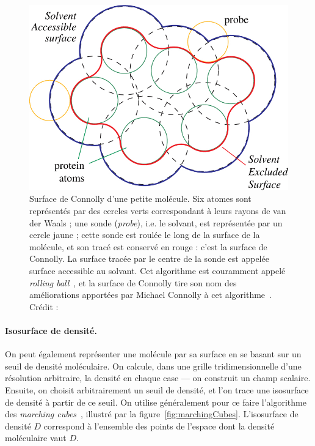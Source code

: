 	\begin{figure}[H]
		\centering
		\includegraphics[width=\textwidth]{figures/ch1/connolly}
		\caption{Surface de Connolly d'une petite molécule. Six atomes sont représentés par des cercles verts correspondant à leurs rayons de van der Waals ; une sonde (\emph{probe}), i.e. le solvant, est représentée par un cercle jaune ; cette sonde est \og roulée \fg{} le long de la surface de la molécule, et son tracé est conservé en rouge : c'est la surface de Connolly. La surface tracée par le centre de la sonde est appelée surface accessible au solvant. Cet algorithme est couramment appelé \emph{rolling ball}~\cite{shrake1973environment}, et la surface de Connolly tire son nom des améliorations apportées par Michael Connolly à cet algorithme~\cite{connolly1983analytical, connolly1993molecular}. Crédit :~\cite{krone2009interactive}}
		\label{fig:connolly}
	\end{figure}
		
	\paragraph{Isosurface de densité.} On peut également représenter une molécule par sa surface en se basant sur un seuil de densité moléculaire. On calcule, dans une grille tridimensionnelle d'une résolution arbitraire, la densité en chaque case --- on construit un champ scalaire. Ensuite, on choisit arbitrairement un seuil de densité, et l'on trace une isosurface de densité à partir de ce seuil. On utilise généralement pour ce faire l'algorithme des \emph{marching cubes}~\cite{lorensen1987marching}, illustré par la figure~\ref{fig:marchingCubes}. L'isosurface de densité $D$ correspond à l'ensemble des points de l'espace dont la densité moléculaire vaut $D$.
		
